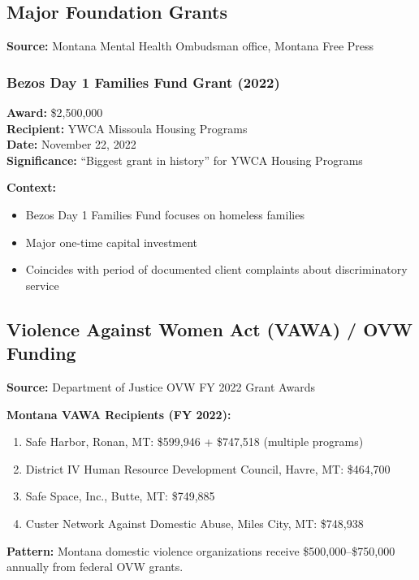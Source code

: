\documentclass[11pt,letterpaper]{article}
\begin{document}
\subsection{Major Foundation Grants}

\textbf{Source:} Montana Mental Health Ombudsman office, Montana Free Press

\subsubsection{Bezos Day 1 Families Fund Grant (2022)}

\textbf{Award:} \$2,500,000\\
\textbf{Recipient:} YWCA Missoula Housing Programs\\
\textbf{Date:} November 22, 2022\\
\textbf{Significance:} ``Biggest grant in history'' for YWCA Housing Programs

\textbf{Context:}
\begin{itemize}[leftmargin=*]
\item Bezos Day 1 Families Fund focuses on homeless families
\item Major one-time capital investment
\item Coincides with period of documented client complaints about discriminatory service
\end{itemize}

\subsection{Violence Against Women Act (VAWA) / OVW Funding}

\textbf{Source:} Department of Justice OVW FY 2022 Grant Awards

\textbf{Montana VAWA Recipients (FY 2022):}
\begin{enumerate}[leftmargin=*]
\item Safe Harbor, Ronan, MT: \$599,946 + \$747,518 (multiple programs)
\item District IV Human Resource Development Council, Havre, MT: \$464,700
\item Safe Space, Inc., Butte, MT: \$749,885
\item Custer Network Against Domestic Abuse, Miles City, MT: \$748,938
\end{enumerate}

\textbf{Pattern:} Montana domestic violence organizations receive \$500,000--\$750,000 annually from federal OVW grants.
\end{document}
